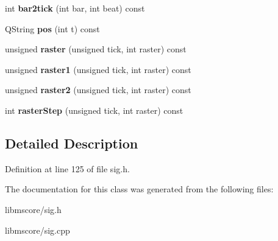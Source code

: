 \begin{DoxyCompactItemize}
int {\bfseries bar2tick} (int bar, int beat) const
\item 
\mbox{\label{class_ms_1_1_time_sig_map_afa51b02d515b7679a8c37cb926a4ca09}} 
Q\+String {\bfseries pos} (int t) const
\item 
\mbox{\label{class_ms_1_1_time_sig_map_af184f83a77254410b4b5b566cb253870}} 
unsigned {\bfseries raster} (unsigned tick, int raster) const
\item 
\mbox{\label{class_ms_1_1_time_sig_map_a4d09200de34fd23e9092c56060d0aa19}} 
unsigned {\bfseries raster1} (unsigned tick, int raster) const
\item 
\mbox{\label{class_ms_1_1_time_sig_map_a5bd4cc316ceab956b28a52dcee11bd3b}} 
unsigned {\bfseries raster2} (unsigned tick, int raster) const
\item 
\mbox{\label{class_ms_1_1_time_sig_map_a36246f3aaf77268fd14d33d016cdc43d}} 
int {\bfseries raster\+Step} (unsigned tick, int raster) const
\end{DoxyCompactItemize}


\subsection{Detailed Description}


Definition at line 125 of file sig.\+h.



The documentation for this class was generated from the following files\+:\begin{DoxyCompactItemize}
\item 
libmscore/sig.\+h\item 
libmscore/sig.\+cpp\end{DoxyCompactItemize}
